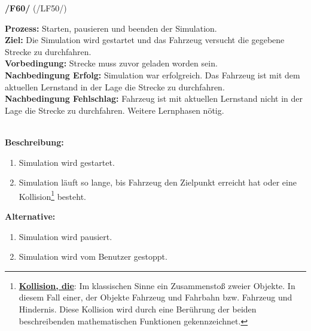 \documentclass[11pt,a4paper]{article}
\begin{document}
	\noindent\large\textbf{/F60/} (/LF50/)
	\normalsize\\
	\begin{addmargin}{0.1 \textwidth}
		\textbf{Prozess:} Starten, pausieren und beenden der Simulation.\\
		\textbf{Ziel:} Die Simulation wird gestartet und das Fahrzeug versucht die gegebene Strecke zu durchfahren.\\
		\textbf{Vorbedingung:} Strecke muss zuvor geladen worden sein.\\
		\textbf{Nachbedingung Erfolg:} Simulation war erfolgreich. Das Fahrzeug ist mit dem aktuellen Lernstand in der Lage die Strecke zu durchfahren.\\
		\textbf{Nachbedingung Fehlschlag:} Fahrzeug ist mit aktuellen Lernstand nicht in der Lage die Strecke zu durchfahren. Weitere Lernphasen nötig.\\
		\\
		\begin{minipage}{\textwidth}
			\textbf{Beschreibung:}
			\begin{enumerate}
				\item Simulation wird gestartet.
				\item Simulation läuft so lange, bis Fahrzeug den Zielpunkt erreicht hat oder eine Kollision\footnote{\underline{\textbf{Kollision, die}}: Im klassischen Sinne ein Zusammenstoß zweier Objekte. In diesem Fall einer, der Objekte Fahrzeug und Fahrbahn bzw. Fahrzeug und Hindernis. Diese Kollision wird durch eine Berührung der beiden beschreibenden mathematischen Funktionen gekennzeichnet.} besteht.\\
			\end{enumerate}
		\end{minipage}
		\begin{minipage}{\textwidth}
			\textbf{Alternative:}
			\begin{enumerate}
				\item Simulation wird pausiert.
				\item Simulation wird vom Benutzer gestoppt.\\
			\end{enumerate}
		\end{minipage}
	\end{addmargin}
\end{document}
